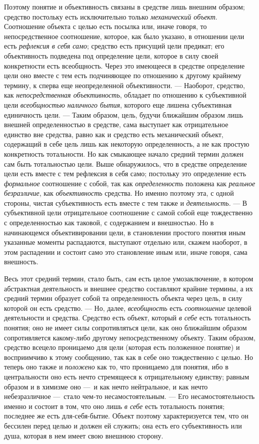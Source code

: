 \documentclass[twoside]{article}
\begin{document}
{{{{Поэтому понятие и объективность связаны в средстве лишь
внешним образом; средство постольку есть исключительно только
{\em механический объект}.
Соотношение объекта с целью есть посылка или, иначе говоря,
то непосредственное соотношение, которое, как было указано, в отношении
цели есть {\em рефлексия в себя само};
средство есть присущий цели предикат; его объективность
подведена под определение цели, которое в силу своей конкретности есть
всеобщность. Через это имеющееся в средстве определение цели оно вместе с
тем есть подчиняющее по отношению к другому крайнему термину, к сперва еще
неопределенной объективности. — Наоборот, средство, как
{\em непосредственная объективность},
обладает по отношению к субъективной цели
{\em всеобщностью наличного бытия},
которого еще лишена субъективная единичность цели. —
Таким образом, цель, будучи ближайшим образом лишь внешней
определенностью в средстве, сама выступает как отрицательное единство вне
средства, равно как и средство есть механический объект, содержащий в себе
цель лишь как некоторую определенность, а не как простую конкретность
тотальности. Но как смыкающее начало средний термин должен сам быть
тотальностью цели. Выше обнаружилось, что в средстве определение цели есть
вместе с тем рефлексия в себя само; постольку это определение есть
{\em формальное}
соотношение с собой, так как
{\em определенность}
положена как {\em реальное
безразличие}, как
{\em объективность}
средства. Но именно поэтому эта, с одной стороны, чистая
субъективность есть вместе с тем также и
{\em деятельность}. — В
субъективной цели отрицательное соотношение с самой собой еще тождественно
с определенностью как таковой, с содержанием и внешностью. Но в
начинающемся объективировании цели, в становлении простого понятия иным
указанные моменты распадаются, выступают отдельно или, скажем наоборот, в
этом распадении и состоит само это становление иным или, иначе говоря, сама
внешность.

Весь этот средний термин, стало быть, сам есть целое
умозаключение, в котором абстрактная деятельность и внешнее средство
составляют крайние термины, а их средний термин образует собой та
определенность объекта через цель, в силу которой он есть средство. —
Но, далее,
{\em всеобщность} есть
{\em соотношение} целевой
деятельности и средства. Средство есть объект, который
{\em в себе} есть
тотальность понятия; оно не имеет силы сопротивляться цели, как оно
ближайшим образом сопротивляется какому-либо другому непосредственному
объекту. Таким образом, средство всецело проницаемо для цели (которая есть
положенное понятие) и восприимчиво к этому сообщению, так как в себе оно
тождественно с целью. Но теперь оно также и
{\em положено} как то,
что проницаемо для понятия, ибо в центральности оно есть нечто стремящееся
к отрицательному единству; равным образом и в химизме оно
—~и как нечто нейтральное, и как нечто небезразличное
—~стало чем-то несамостоятельным. — Его
несамостоятельность именно и состоит в том, что оно лишь
{\em в себе} есть
тотальность понятия; последнее же есть для-себя-бытие. Объект поэтому
характеризуется тем, что он бессилен перед целью и должен ей служить; она
есть его субъективность или душа, которая в нем имеет свою внешнюю сторону.

}}}}
\end{document}
